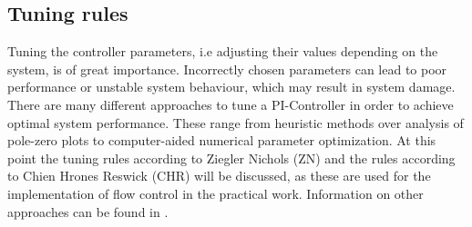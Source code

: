 \subsection{Tuning rules}
Tuning the controller parameters, i.e adjusting their values depending on the system, is of great importance. Incorrectly chosen parameters can lead to poor performance or unstable system behaviour, which may result in system damage. There are many different approaches to tune a PI-Controller in order to achieve optimal system performance. These range from heuristic methods over analysis of pole-zero plots to computer-aided numerical parameter optimization. \cite{Reg_10} At this point the tuning rules according to Ziegler Nichols (ZN) and the rules according to Chien Hrones Reswick (CHR) will be discussed, as these are used for the implementation of flow control in the practical work.  Information on other approaches can be found in \cite{Reg_11}.

